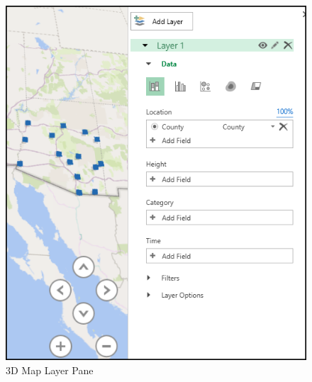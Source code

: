 \begin{enumerate}[resume]
\begin{itemize}
		\begin{figure}[H]
			\centering
			\includegraphics[width=\maxwidth{.65\linewidth}]{gfx/ch08_fig25}
			\caption{$ 3 $D Map Layer Pane}
			\label{08:fig25}
		\end{figure}

	\end{itemize}
	
\end{enumerate}


